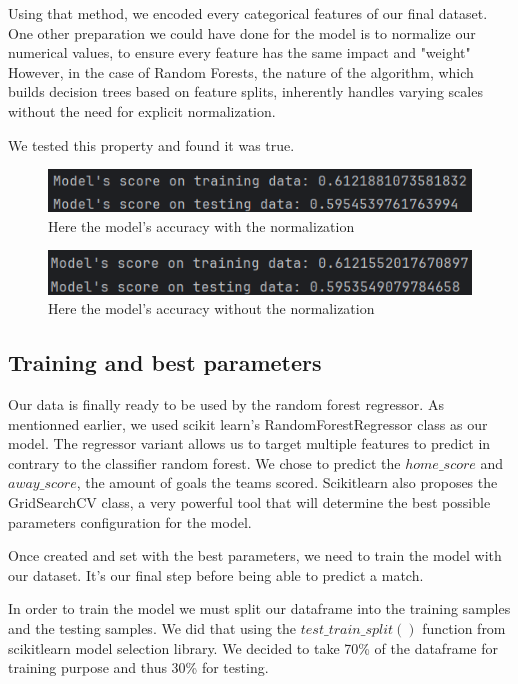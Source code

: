 \newpage
Using that method, we encoded every categorical features of our final dataset. 
One other preparation we could have done for the model is to normalize our numerical values, to ensure every feature has the same impact and "weight"
However, in the case of Random Forests, the nature of the algorithm, which builds decision trees based on feature splits, inherently handles varying scales without the need for explicit normalization.

We tested this property and found it was true.\\
\begin{figure}[h]
  \centering
  \includegraphics[width=0.8\linewidth]{withNormalization.png}
  \caption{Here the model's accuracy with the normalization}
\end{figure}

\begin{figure}[h]
  \centering
  \includegraphics[width=0.8\linewidth]{withoutNormalization.png}
  \caption{Here the model's accuracy without the normalization}
\end{figure}

\subsection{Training and best parameters}
Our data is finally ready to be used by the random forest regressor.
As mentionned earlier, we used scikit learn's RandomForestRegressor class as our model.
The regressor variant allows us to target multiple features to predict in contrary to the classifier random forest.
We chose to predict the $home\_score$ and $away\_score$, the amount of goals the teams scored.
Scikitlearn also proposes the GridSearchCV class, a very powerful tool that will determine the best possible parameters configuration for the model.

Once created and set with the best parameters, we need to train the model with our dataset. 
It's our final step before being able to predict a match.

In order to train the model we must split our dataframe into the training samples and the testing samples.
We did that using the $test\_train\_split()$ function from scikitlearn model selection library.
We decided to take 70\% of the dataframe for training purpose and thus 30\% for testing.

